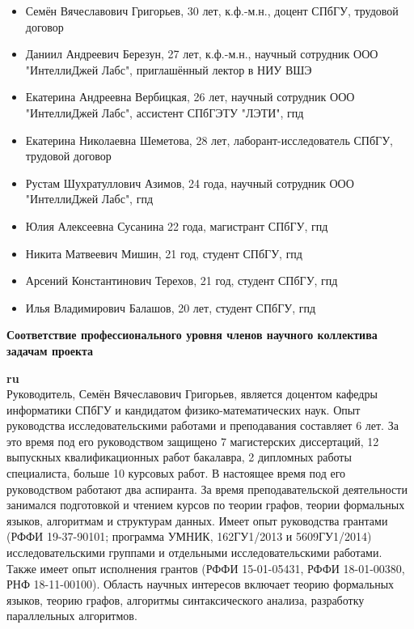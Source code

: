 \documentclass[12pt]{article}  %
\theoremstyle{remark}
\begin{document}
\begin{itemize}
  \item Семён Вячеславович Григорьев, 30 лет, к.ф.-м.н., доцент СПбГУ, трудовой договор
  \item Даниил Андреевич Березун, 27 лет, к.ф.-м.н.,
    научный сотрудник ООО "ИнтеллиДжей Лабс",
    приглашённый лектор в НИУ ВШЭ
  \item Екатерина Андреевна Вербицкая, 26 лет, научный сотрудник ООО "ИнтеллиДжей Лабс", ассистент СПбГЭТУ "ЛЭТИ", гпд
  \item Екатерина Николаевна Шеметова, 28 лет, лаборант-исследователь СПбГУ, трудовой договор
  \item Рустам Шухратуллович Азимов, 24 года, научный сотрудник ООО "ИнтеллиДжей Лабс", гпд
  \item Юлия Алексеевна Сусанина 22 года, магистрант СПбГУ, гпд
  \item Никита Матвеевич Мишин, 21 год, студент СПбГУ, гпд
  \item Арсений Константинович Терехов, 21 год, студент СПбГУ, гпд
  \item Илья Владимирович Балашов, 20 лет, студент СПбГУ, гпд
\end{itemize}



\textbf{Соответствие профессионального уровня членов научного коллектива задачам проекта}

\textbf{ru}\\
%
Руководитель, Семён Вячеславович Григорьев, является доцентом кафедры информатики СПбГУ и кандидатом физико-математических наук.
Опыт руководства исследовательскими работами и преподавания составляет 6 лет.
За это время под его руководством защищено 7 магистерских диссертаций, 12 выпускных квалификационных работ бакалавра, 2 дипломных работы специалиста, больше 10 курсовых работ.
В настоящее время под его руководством работают два аспиранта.
За время преподавательской деятельности занимался подготовкой и чтением курсов по теории графов, теории формальных языков, алгоритмам и структурам данных.
Имеет опыт руководства грантами (РФФИ 19-37-90101; программа УМНИК, 162ГУ1/2013 и 5609ГУ1/2014) исследовательскими группами и отдельными исследовательскими работами.
Также имеет опыт исполнения грантов (РФФИ 15-01-05431, РФФИ 18-01-00380, РНФ 18-11-00100).
Область научных интересов включает теорию формальных языков, теорию графов, алгоритмы синтаксического анализа, разработку параллельных алгоритмов.
\end{document}
